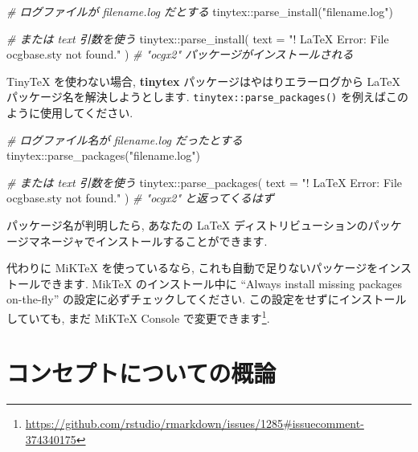 \documentclass[
  11pt,
]{bxjsreport}
\newenvironment{Shaded}{\begin{snugshade}}{\end{snugshade}}
\newcommand{\AttributeTok}[1]{\textcolor[rgb]{0.77,0.63,0.00}{#1}}
\newcommand{\CommentTok}[1]{\textcolor[rgb]{0.56,0.35,0.01}{\textit{#1}}}
\newcommand{\FunctionTok}[1]{\textcolor[rgb]{0.00,0.00,0.00}{#1}}
\newcommand{\NormalTok}[1]{#1}
\newcommand{\SpecialCharTok}[1]{\textcolor[rgb]{0.00,0.00,0.00}{#1}}
\newcommand{\StringTok}[1]{\textcolor[rgb]{0.31,0.60,0.02}{#1}}
\renewcommand{\href}[2]{#2\footnote{\url{#1}}}
\begin{document}
\begin{Shaded}
\begin{Highlighting}[numbers=left,,]
\CommentTok{\# ログファイルが filename.log だとする}
\NormalTok{tinytex}\SpecialCharTok{::}\FunctionTok{parse\_install}\NormalTok{(}\StringTok{"filename.log"}\NormalTok{)}

\CommentTok{\# または \textasciigrave{}text\textasciigrave{} 引数を使う}
\NormalTok{tinytex}\SpecialCharTok{::}\FunctionTok{parse\_install}\NormalTok{(}
  \AttributeTok{text =} \StringTok{"! LaTeX Error: File \textasciigrave{}ocgbase.sty\textquotesingle{} not found."}
\NormalTok{)}
\CommentTok{\# "ocgx2" パッケージがインストールされる}
\end{Highlighting}
\end{Shaded}

TinyTeX を使わない場合, \textbf{tinytex} パッケージはやはりエラーログから LaTeX パッケージ名を解決しようとします. \texttt{tinytex::parse\_packages()} を例えばこのように使用してください.

\begin{Shaded}
\begin{Highlighting}[numbers=left,,]
\CommentTok{\# ログファイル名が filename.log だったとする}
\NormalTok{tinytex}\SpecialCharTok{::}\FunctionTok{parse\_packages}\NormalTok{(}\StringTok{"filename.log"}\NormalTok{)}

\CommentTok{\# または \textasciigrave{}text\textasciigrave{} 引数を使う}
\NormalTok{tinytex}\SpecialCharTok{::}\FunctionTok{parse\_packages}\NormalTok{(}
  \AttributeTok{text =} \StringTok{"! LaTeX Error: File \textasciigrave{}ocgbase.sty\textquotesingle{} not found."}
\NormalTok{)}
\CommentTok{\# "ocgx2" と返ってくるはず}
\end{Highlighting}
\end{Shaded}

パッケージ名が判明したら, あなたの LaTeX ディストリビューションのパッケージマネージャでインストールすることができます.

代わりに MiKTeX を使っているなら, これも自動で足りないパッケージをインストールできます. MikTeX のインストール中に ``Always install missing packages on-the-fly'' の設定に必ずチェックしてください. この設定をせずにインストールしていても, \href{https://github.com/rstudio/rmarkdown/issues/1285\#issuecomment-374340175}{まだ MiKTeX Console で変更できます}.

\hypertarget{conceptual-overview}{%
\chapter{コンセプトについての概論}\label{conceptual-overview}}
\end{document}
